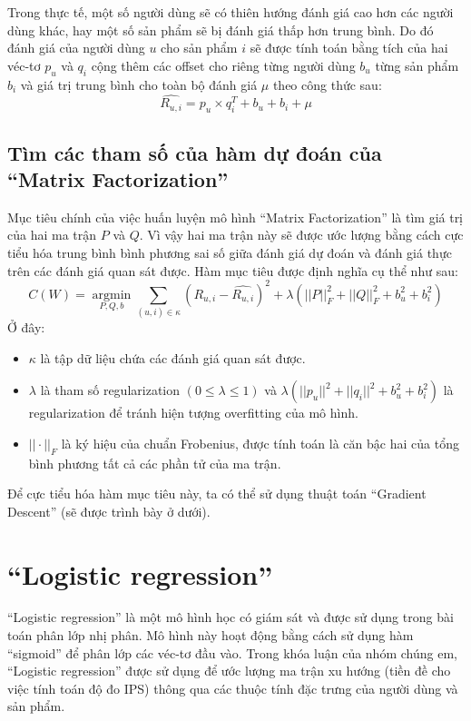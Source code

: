 Trong thực tế, một số người dùng sẽ có thiên hướng đánh giá cao hơn các người dùng khác, hay một số sản phẩm sẽ bị đánh giá thấp hơn trung bình. Do đó đánh giá của người dùng $u$ cho sản phẩm $i$ sẽ được tính toán bằng tích của hai véc-tơ $p_u$ và $q_i$ cộng thêm các offset cho riêng từng người dùng $b_u$ từng sản phẩm $b_i$ và giá trị trung bình cho toàn bộ đánh giá $\mu$ theo công thức sau:
\begin{equation}
\label{eq:2.1_R_ui}
    \hat{R_{u,i}} = p_u\times q_{i}^T + b_u + b_i + \mu
\end{equation}
\subsection{Tìm các tham số của hàm dự đoán của ``Matrix Factorization''}
Mục tiêu chính của việc huấn luyện mô hình ``Matrix Factorization'' là tìm giá trị của hai ma trận $P$ và $Q$. Vì vậy hai ma trận này sẽ được ước lượng bằng cách cực tiểu hóa trung bình bình phương sai số giữa đánh giá dự đoán và đánh giá thực trên các đánh giá quan sát được. Hàm mục tiêu được định nghĩa cụ thể như sau:
\begin{equation}
\label{eq:2.1_objective}
    C(W) = \operatorname*{argmin}_{P,Q,b} \sum_{(u,i)\in\kappa} (R_{u,i} - \hat{R_{u,i}})^2 + \lambda(||P||_{F}^2 + ||Q||_{F}^2 + b_{u}^2 + b_{i}^2)
\end{equation}
Ở đây: 
\begin{itemize}
    \item $\kappa$ là tập dữ liệu chứa các đánh giá quan sát được.
    \item $\lambda$ là tham số regularization $(0 \leq \lambda \leq 1)$ và $\lambda(||p_u||^2 + ||q_i||^2 + b_{u}^2 + b_{i}^2)$ là regularization để tránh hiện tượng overfitting của mô hình.
    \item $||\cdot||_{F}$ là ký hiệu của chuẩn Frobenius, được tính toán là căn bậc hai của tổng bình phương tất cả các phần tử của ma trận.
\end{itemize}

Để cực tiểu hóa hàm mục tiêu này, ta có thể sử dụng thuật toán ``Gradient Descent'' (sẽ được trình bày ở dưới).

\section{``Logistic regression''}
``Logistic regression'' là một mô hình học có giám sát và được sử dụng trong bài toán phân lớp nhị phân. Mô hình này hoạt động bằng cách sử dụng hàm ``sigmoid'' để phân lớp các véc-tơ đầu vào. Trong khóa luận của nhóm chúng em, ``Logistic regression'' được sử dụng để ước lượng ma trận xu hướng (tiền đề cho việc tính toán độ đo IPS) thông qua các thuộc tính đặc trưng của người dùng và sản phẩm.

